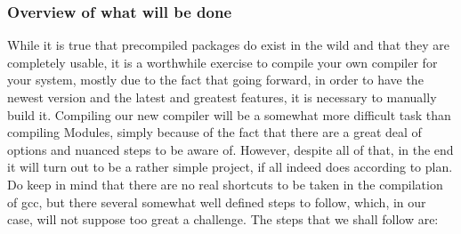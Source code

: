 \documentclass[]{article}
\begin{document}
                                                                                                                        \subsubsection{Overview of what will be done}
                                                                                                                        While it is true that precompiled packages do exist in the wild and that they are completely usable, 
                                                                                                                        it is a worthwhile exercise to compile your own compiler for your system, mostly due to the fact that 
                                                                                                                        going forward, in order to have the newest version and the latest  and greatest features, it is necessary 
                                                                                                                        to manually build it. Compiling our new compiler will be a somewhat more difficult task than compiling
                                                                                                                        Modules, simply because of the fact that there are a great deal of options and nuanced steps to be aware of.
                                                                                                                        However, despite all of that, in the end it will turn out to be a rather simple project, if all indeed does
                                                                                                                        according to plan.
                                                                                                                        \\
                                                                                                                            Do keep in mind that there are no real shortcuts to be taken in the compilation of gcc, but there several 
                                                                                                                            somewhat well defined steps to follow, which, in our case, will not suppose too great a challenge. The steps
                                                                                                                            that we shall follow are:
\end{document}
